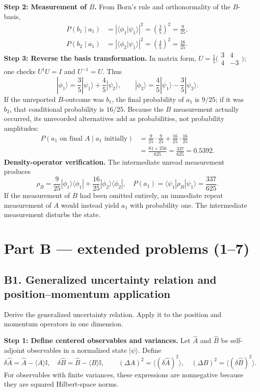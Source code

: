 \documentclass[11pt,a4paper]{article}
\newcommand{\id}{\mathbb I}
\newcommand{\bra}[1]{\langle #1|}
\newcommand{\ket}[1]{|#1\rangle}
\newcommand{\braket}[2]{\langle #1|#2\rangle}
\newcommand{\abs}[1]{\left|#1\right|}
\begin{document}
\textbf{Step 2: Measurement of $B$.} From Born's rule and orthonormality of the $B$-basis,
\begin{align}
P(b_1\mid a_1)&=\abs{\braket{\phi_1}{\psi_1}}^2=\left(\frac35\right)^2=\frac9{25},\\
P(b_2\mid a_1)&=\abs{\braket{\phi_2}{\psi_1}}^2=\left(\frac45\right)^2=\frac{16}{25}.
\end{align}
\textbf{Step 3: Reverse the basis transformation.} In matrix form, $U=\frac15\bigl(\begin{smallmatrix}3&4\\4&-3\end{smallmatrix}\bigr)$; one checks $U^\dagger U=I$ and $U^{-1}=U$. Thus
\begin{equation}
\ket{\phi_1}=\frac35\ket{\psi_1}+\frac45\ket{\psi_2},\qquad
\ket{\phi_2}=\frac45\ket{\psi_1}-\frac35\ket{\psi_2}.
\end{equation}
If the unreported $B$-outcome was $b_1$, the final probability of $a_1$ is $9/25$; if it was $b_2$, that conditional probability is $16/25$. Because the $B$ measurement actually occurred, its unrecorded alternatives add as probabilities, not probability amplitudes:
\begin{align}
P(a_1\text{ on final }A\mid a_1\text{ initially})
&=\frac9{25}\cdot\frac9{25}+\frac{16}{25}\cdot\frac{16}{25}\\
&=\frac{81+256}{625}=\boxed{\frac{337}{625}=0.5392}.
\end{align}
\textbf{Density-operator verification.} The intermediate unread measurement produces
\begin{equation}
\rho_B=\frac9{25}\ket{\phi_1}\bra{\phi_1}+\frac{16}{25}\ket{\phi_2}\bra{\phi_2},
\quad P(a_1)=\langle\psi_1|\rho_B|\psi_1\rangle=\frac{337}{625}.
\end{equation}
If the measurement of $B$ had been omitted entirely, an immediate repeat measurement of $A$ would instead yield $a_1$ with probability one. The intermediate measurement disturbs the state.

\section{Part B --- extended problems (1--7)}
\subsection{B1. Generalized uncertainty relation and position--momentum application}
\begin{questionbox}
Derive the generalized uncertainty relation. Apply it to the position and momentum operators in one dimension.
\end{questionbox}
\textbf{Step 1: Define centered observables and variances.} Let $\hat A$ and $\hat B$ be self-adjoint observables in a normalized state $\ket\psi$. Define
\begin{equation}
\delta\hat A=\hat A-\langle A\rangle\id,\quad \delta\hat B=\hat B-\langle B\rangle\id,\qquad
(\Delta A)^2=\langle(\delta\hat A)^2\rangle,\quad(\Delta B)^2=\langle(\delta\hat B)^2\rangle.
\end{equation}
For observables with finite variances, these expressions are nonnegative because they are squared Hilbert-space norms.
\end{document}

